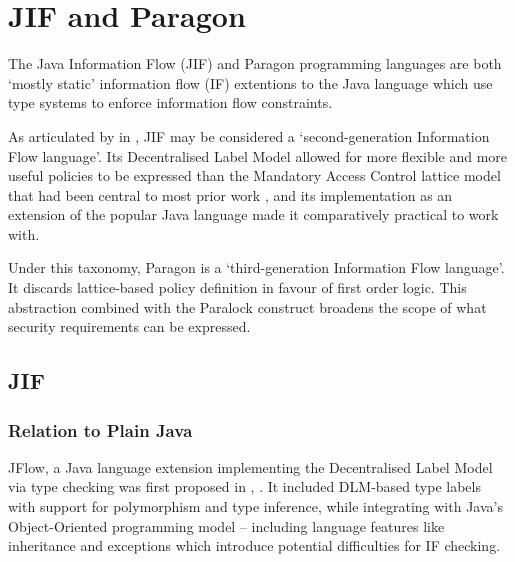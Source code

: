 \chapter{JIF and Paragon} \label{intro_to_jif_para}

The Java Information Flow (JIF) and Paragon programming languages are both `mostly static' information flow (IF) extentions to the Java language which use type systems to enforce information flow constraints.

As articulated by \citeauthor{broberg2013paragon} in  \cite{broberg2013paragon}, JIF may be considered a `second-generation Information Flow language'. Its Decentralised Label Model allowed for more flexible and more useful policies to be expressed than the Mandatory Access Control lattice model that had been central to most prior work \cite{denning1977certification}, and its implementation as an extension of the popular Java language made it comparatively practical to work with.

Under this taxonomy, Paragon is a `third-generation Information Flow language'. It discards lattice-based policy definition in favour of first order logic. This abstraction combined with the Paralock construct broadens the scope of what security requirements can be expressed.


\newpage

\section{JIF}

\subsection{Relation to Plain Java}

JFlow, a Java language extension implementing the Decentralised Label Model via type checking was first proposed in , \cite{myers1999jflow}. It included DLM-based type labels with support for polymorphism and type inference, while integrating with Java's Object-Oriented programming model -- including language features like inheritance and exceptions which introduce potential difficulties for IF checking.

